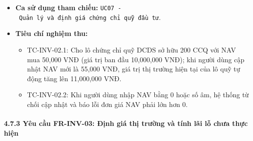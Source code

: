 \documentclass[11pt,a4paper]{article}
\providecommand{\tightlist}{
  \setlength{\itemsep}{0pt}\setlength{\parskip}{0pt}}
\begin{document}
\begin{itemize}
  \begin{itemize}
  \tightlist
  \item
    Đơn giá NAV mới được cập nhật trong hệ thống.
  \item
    Giá trị thị trường hiện tại của toàn bộ các khoản đầu tư cùng mã quỹ
    được tính lại đồng bộ.
  \item
    Thông báo cập nhật NAV thành công.
  \end{itemize}
\item
  \textbf{Ca sử dụng tham chiếu:}
  \texttt{UC07\ -\ Quản\ lý\ và\ định\ giá\ chứng\ chỉ\ quỹ\ đầu\ tư}.
\item
  \textbf{Tiêu chí nghiệm thu:}

  \begin{itemize}
  \tightlist
  \item
    TC-INV-02.1: Cho lô chứng chỉ quỹ DCDS sở hữu 200 CCQ với NAV mua
    50,000 VNĐ (giá trị ban đầu 10,000,000 VNĐ); khi người dùng cập nhật
    NAV mới là 55,000 VNĐ, giá trị thị trường hiện tại của lô quỹ tự
    động tăng lên 11,000,000 VNĐ.
  \item
    TC-INV-02.2: Khi người dùng nhập NAV bằng 0 hoặc số âm, hệ thống từ
    chối cập nhật và báo lỗi đơn giá NAV phải lớn hơn 0.
  \end{itemize}
\end{itemize}

\newpage

\paragraph{4.7.3 Yêu cầu FR-INV-03: Định giá thị trường và tính lãi lỗ
chưa thực
hiện}\label{473-yuxeau-cux1ea7u-fr-inv-03-ux111ux1ecbnh-giuxe1-thux1ecb-trux1b0ux1eddng-vuxe0-tuxednh-luxe3i-lux1ed7-chux1b0a-thux1ef1c-hiux1ec7n}
\end{document}
